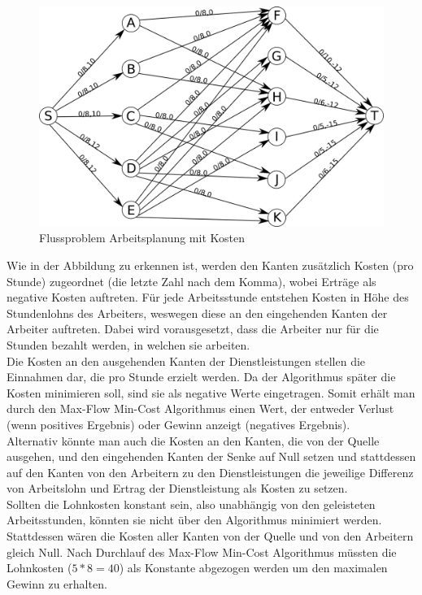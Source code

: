 \documentclass[12pt]{amsart}
\begin{document}
\begin{figure}[ht!]
\centering
\includegraphics[width=150mm]{cost-graph.png}
\caption{Flussproblem Arbeitsplanung mit Kosten}
\label{overflow}
\end{figure}

Wie in der Abbildung zu erkennen ist, werden den Kanten zusätzlich Kosten (pro Stunde) zugeordnet (die letzte Zahl nach dem Komma), wobei Erträge als negative Kosten auftreten. Für jede Arbeitsstunde entstehen Kosten in Höhe des Stundenlohns des Arbeiters, weswegen diese an den eingehenden Kanten der Arbeiter auftreten. Dabei wird vorausgesetzt, dass die Arbeiter nur für die Stunden bezahlt werden, in welchen sie arbeiten.  \\
Die Kosten an den ausgehenden Kanten der Dienstleistungen stellen die Einnahmen dar, die pro Stunde erzielt werden. Da der Algorithmus später die Kosten minimieren soll, sind sie als negative Werte eingetragen. Somit erhält man durch den Max-Flow Min-Cost Algorithmus einen Wert, der entweder Verlust (wenn positives Ergebnis) oder Gewinn anzeigt (negatives Ergebnis). \\
Alternativ könnte man auch die Kosten an den Kanten, die von der Quelle ausgehen, und den eingehenden Kanten der Senke auf Null setzen und stattdessen auf den Kanten von den Arbeitern zu den Dienstleistungen die jeweilige Differenz von Arbeitslohn und Ertrag der Dienstleistung als Kosten zu setzen.\\

Sollten die Lohnkosten konstant sein, also unabhängig von den geleisteten Arbeitsstunden, könnten sie nicht über den Algorithmus minimiert werden. Stattdessen wären die Kosten aller Kanten von der Quelle und von den Arbeitern gleich Null. Nach Durchlauf des Max-Flow Min-Cost Algorithmus müssten die Lohnkosten ($ 5 * 8 = 40$) als Konstante abgezogen werden um den maximalen Gewinn zu erhalten.\\
\end{document}
